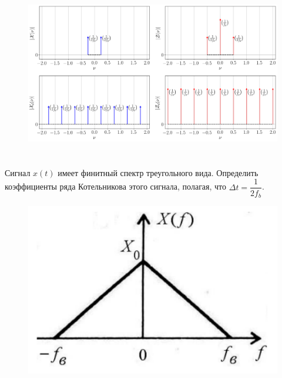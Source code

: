 \begin{figure}[!h]
	\centering
	\includegraphics[width=0.90\columnwidth]{pics/fall/2/2-1.png}
	\label{fig:2-1}
\end{figure}


\newpage
\section{}
Сигнал $x(t)$ имеет финитный спектр треугольного вида. Определить коэффициенты ряда Котельникова этого сигнала, полагая, что $\Delta t = \dfrac{1}{2f_{b}}$.

\begin{figure}[!h]
	\centering
	\includegraphics[width=0.20\columnwidth]{pics/fall/2/triangle.png}
	\label{2_triangle}
\end{figure}



